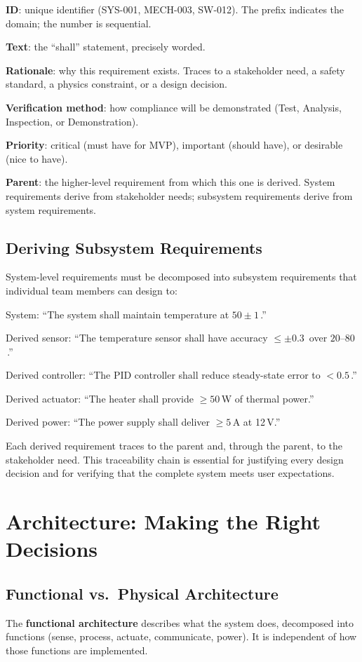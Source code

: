 \textbf{ID}: unique identifier (SYS-001, MECH-003, SW-012). The prefix indicates the domain; the number is sequential.

\textbf{Text}: the ``shall'' statement, precisely worded.

\textbf{Rationale}: why this requirement exists. Traces to a stakeholder need, a safety standard, a physics constraint, or a design decision.

\textbf{Verification method}: how compliance will be demonstrated (Test, Analysis, Inspection, or Demonstration).

\textbf{Priority}: critical (must have for MVP), important (should have), or desirable (nice to have).

\textbf{Parent}: the higher-level requirement from which this one is derived. System requirements derive from stakeholder needs; subsystem requirements derive from system requirements.

\subsection{Deriving Subsystem Requirements}
System-level requirements must be decomposed into subsystem requirements that individual team members can design to:

System: ``The system shall maintain temperature at $50 \pm 1$\,\degC{}.''

Derived sensor: ``The temperature sensor shall have accuracy $\leq \pm 0.3$\,\degC{} over $20$--$80$\,\degC{}.''

Derived controller: ``The PID controller shall reduce steady-state error to $< 0.5$\,\degC{}.''

Derived actuator: ``The heater shall provide $\geq 50$\,W of thermal power.''

Derived power: ``The power supply shall deliver $\geq 5$\,A at 12\,V.''

Each derived requirement traces to the parent and, through the parent, to the stakeholder need. This traceability chain is essential for justifying every design decision and for verifying that the complete system meets user expectations.

\section{Architecture: Making the Right Decisions}
\subsection{Functional vs.\ Physical Architecture}
The \textbf{functional architecture} describes what the system does, decomposed into functions (sense, process, actuate, communicate, power). It is independent of how those functions are implemented.

